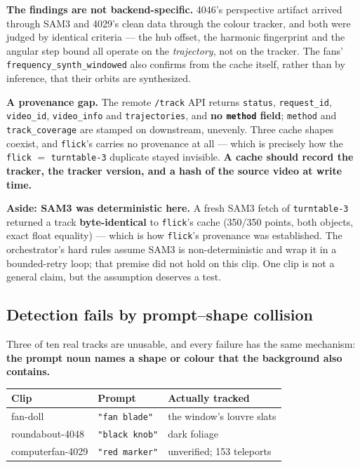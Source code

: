 \documentclass[11pt,a4paper]{article}
\begin{document}
\textbf{The findings are not backend-specific.} 4046's perspective artifact arrived through SAM3
and 4029's clean data through the colour tracker, and both were judged by identical criteria ---
the hub offset, the harmonic fingerprint and the angular step bound all operate on the
\emph{trajectory}, not on the tracker. The fans' \texttt{frequency\_synth\_windowed} also
confirms from the cache itself, rather than by inference, that their orbits are synthesized.

\textbf{A provenance gap.} The remote \texttt{/track} API returns \texttt{status},
\texttt{request\_id}, \texttt{video\_id}, \texttt{video\_info} and \texttt{trajectories}, and
\textbf{no \texttt{method} field}; \texttt{method} and \texttt{track\_coverage} are stamped on downstream, unevenly. Three
cache shapes coexist, and \texttt{flick}'s carries no provenance at all --- which is precisely
how the \texttt{flick} $=$ \texttt{turntable-3} duplicate stayed invisible. \textbf{A cache
should record the tracker, the tracker version, and a hash of the source video at write time.}

\textbf{Aside: SAM3 was deterministic here.} A fresh SAM3 fetch of \texttt{turntable-3} returned
a track \textbf{byte-identical} to \texttt{flick}'s cache (350/350 points, both objects, exact
float equality) --- which is how \texttt{flick}'s provenance was established. The orchestrator's
hard rules assume SAM3 is non-deterministic and wrap it in a bounded-retry loop; that premise did
not hold on this clip. One clip is not a general claim, but the assumption deserves a test.

\subsection{Detection fails by prompt--shape collision}
\label{sec:prompts}

Three of ten real tracks are unusable, and every failure has the same mechanism: \textbf{the
prompt noun names a shape or colour that the background also contains.}

\begin{center}
\begin{tabular}{lll}
\toprule
Clip & Prompt & Actually tracked \\
\midrule
fan-doll         & \texttt{"fan blade"}   & the window's louvre slats \\
roundabout-4048  & \texttt{"black knob"}  & dark foliage \\
computerfan-4029 & \texttt{"red marker"}  & unverified; 153 teleports \\
\bottomrule
\end{tabular}
\end{center}
\end{document}
